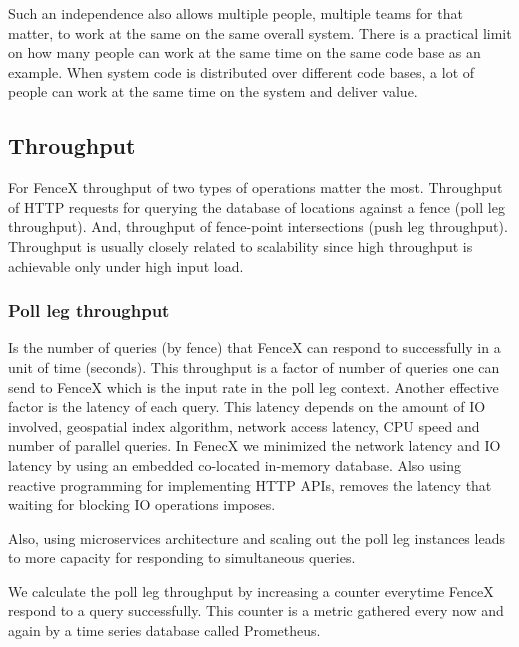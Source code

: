 \documentclass[a4]{report}
\begin{document}
        Such an independence also allows multiple people, multiple teams for that matter, to work at the same on the same
        overall system.
        There is a practical limit on how many people can work at the same time on the same code base as an example.
        When system code is distributed over different code bases, a lot of people can work at the same time on the
        system and deliver value.

        \subsection{Throughput}
        For FenceX throughput of two types of operations matter the most.
        Throughput of HTTP requests for querying the database of locations against a fence (poll leg throughput).
        And, throughput of fence-point intersections (push leg throughput).
        Throughput is usually closely related to scalability since high throughput is achievable only under high input load.

        \subsubsection{Poll leg throughput}
        Is the number of queries (by fence) that FenceX can respond to successfully in a unit of time (seconds).
        This throughput is a factor of number of queries one can send to FenceX which is the input rate in the poll leg context.
        Another effective factor is the latency of each query.
        This latency depends on the amount of IO involved, geospatial index algorithm, network access latency, CPU speed
        and number of parallel queries.
        In FenecX we minimized the network latency and IO latency by using an embedded co-located in-memory database.
        Also using reactive programming for implementing HTTP APIs, removes the latency that waiting for blocking IO
        operations imposes.

        Also, using microservices architecture and scaling out the poll leg instances leads to more capacity for responding
        to simultaneous queries.

        We calculate the poll leg throughput by increasing a counter everytime FenceX respond to a query successfully.
        This counter is a metric gathered every now and again by a time series database called Prometheus\cite{prometheus}.
\end{document}
